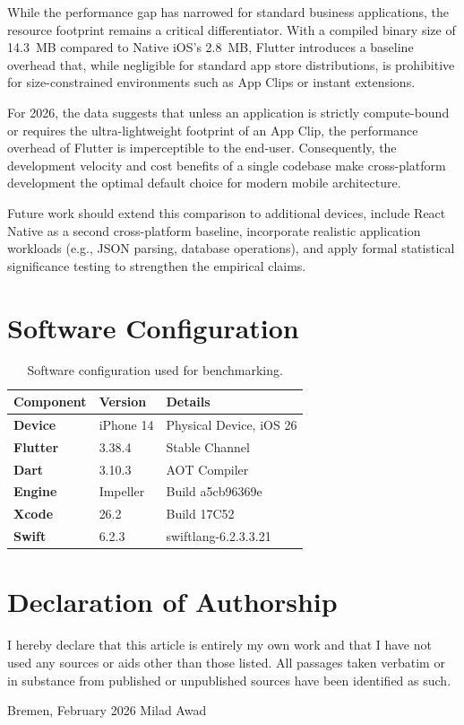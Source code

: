 \documentclass[journal]{IEEEtran}
\begin{document}
While the performance gap has narrowed for standard business applications, the resource footprint remains
a critical differentiator. With a compiled binary size of 14.3~MB compared to Native iOS's
2.8~MB, Flutter introduces a baseline overhead that, while negligible for standard app store
distributions, is prohibitive for size-constrained environments such as App Clips or instant extensions.

For 2026, the data suggests that unless an application is strictly compute-bound or requires the
ultra-lightweight footprint of an App Clip, the performance overhead of Flutter is imperceptible to the
end-user. Consequently, the development velocity and cost benefits of a single codebase make
cross-platform development the optimal default choice for modern mobile architecture.

Future work should extend this comparison to additional devices, include React Native as a second cross-platform baseline, incorporate realistic application workloads (e.g., JSON parsing, database operations), and apply formal statistical significance testing to strengthen the empirical claims.




\appendices
\section{Software Configuration}

\begin{table}[h!]
	\caption{Software configuration used for benchmarking.}
	\label{tab:config}
	\centering
	\begin{tabular}{lll}
		\toprule
		\textbf{Component} & \textbf{Version} & \textbf{Details}        \\
		\midrule
		\textbf{Device}    & iPhone 14        & Physical Device, iOS 26 \\
		\textbf{Flutter}   & 3.38.4           & Stable Channel          \\
		\textbf{Dart}      & 3.10.3           & AOT Compiler            \\
		\textbf{Engine}    & Impeller         & Build a5cb96369e        \\
		\textbf{Xcode}     & 26.2             & Build 17C52             \\
		\textbf{Swift}     & 6.2.3            & swiftlang-6.2.3.3.21    \\
		\bottomrule
	\end{tabular}
\end{table}

\section*{Declaration of Authorship}
I hereby declare that this article is entirely my own work and that I have not used any sources or aids other than those listed. All passages taken verbatim or in substance from published or unpublished sources have been identified as such.

\vspace{1cm}
\noindent Bremen, February 2026 \hfill Milad Awad
\end{document}
